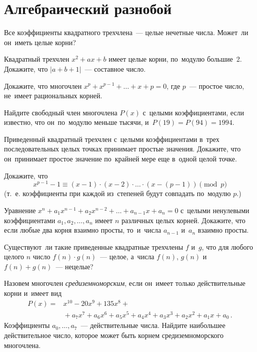 
\section*{Алгебраический разнобой}


\begin{problems}

\item
Все коэффициенты квадратного трехчлена~--- целые нечетные числа.
Может~ли он~иметь целые корни?

\item
Квадратный трехчлен $x^2 + a x + b$ имеет целые корни, по~модулю большие~2.
Докажите, что $|a + b + 1|$~--- составное число.

\item
Докажите, что многочлен $x^p + x^{p-1} + \ldots + x + p = 0$, где $p$~---
простое число, не~имеет рациональных корней.

\item
Найдите свободный член многочлена $P(x)$ с~целыми коэффициентами, если
известно, что он~по~модулю меньше тысячи, и~$P(19) = P(94) = 1994$.

\item
Приведенный квадратный трехчлен с~целыми коэффициентами в~трех
последовательных целых точках принимает простые значения.
Докажите, что он~принимает простое значение по~крайней мере еще в~одной
целой точке.

\item
Докажите, что
\[
    x^{p-1} - 1
\equiv
    (x - 1) \cdot (x - 2) \cdot \ldots \cdot (x - (p - 1))
\pmod{p}
\]
(т.~е. коэффициенты при каждой из~степеней будут совпадать по~модулю $p$.)

\item
Уравнение $x^n + a_1 x^{n-1} + a_2 x^{n-2} + \ldots + a_{n-1} x + a_n = 0$
с~целыми ненулевыми коэффициентами $a_1, a_2, \ldots, a_n$ имеет $n$ различных
целых корней.
Докажите, что если любые два корня взаимно просты, то~и~числа $a_{n-1}$ и~$a_n$
взаимно просты.

\item
Существуют~ли такие приведенные квадратные трехчлены $f$ и~$g$, что для любого
целого $n$ число $f(n) \cdot g(n)$~--- целое, а~числа $f(n)$, $g(n)$
и~$f(n) + g(n)$~--- нецелые?

\item
Назовем многочлен \emph{средиземноморским}, если он~имеет только действительные
корни и~имеет вид
\begin{align*}
    P(x)
={}&
    x^{10} - 20 x^9 + 135 x^8
    +\\&{}+
    a_7 x^7 + a_6 x^6 + a_5 x^5 + a_4 x^4 + a_3 x^3 + a_2 x^2 + a_1 x + a_0
\,.\end{align*}
Коэффициенты $a_0, \ldots, a_7$~--- действительные числа.
Найдите наибольшее действительное
число, которое может быть корнем средиземноморского многочлена.

\end{problems}

